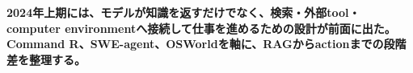 \noindent\textbf{2024年上期には、モデルが知識を返すだけでなく、検索・外部tool・computer environmentへ接続して仕事を進めるための設計が前面に出た。Command R、SWE-agent、OSWorldを軸に、RAGからactionまでの段階差を整理する。}\autocite{src-1c9f1d22c176,src-70b5d4b3bedd,src-77e35e5f22be}
